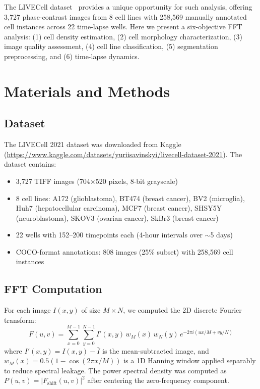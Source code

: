 \documentclass[11pt,a4paper]{article}
\begin{document}
The LIVECell dataset~\cite{edlund2021livecell} provides a unique opportunity for
such analysis, offering 3,727 phase-contrast images from 8 cell lines with 258,569
manually annotated cell instances across 22 time-lapse wells. Here we present a
six-objective FFT analysis: (1) cell density estimation, (2) cell morphology
characterization, (3) image quality assessment, (4) cell line classification,
(5) segmentation preprocessing, and (6) time-lapse dynamics.

\section{Materials and Methods}

\subsection{Dataset}

The LIVECell 2021 dataset was downloaded from Kaggle
(\url{https://www.kaggle.com/datasets/yuriisavinskyi/livecell-dataset-2021}).
The dataset contains:
\begin{itemize}
    \item 3,727 TIFF images (704$\times$520 pixels, 8-bit grayscale)
    \item 8 cell lines: A172 (glioblastoma), BT474 (breast cancer), BV2 (microglia),
          Huh7 (hepatocellular carcinoma), MCF7 (breast cancer), SHSY5Y
          (neuroblastoma), SKOV3 (ovarian cancer), SkBr3 (breast cancer)
    \item 22 wells with 152--200 timepoints each (4-hour intervals over $\sim$5 days)
    \item COCO-format annotations: 808 images (25\% subset) with 258,569 cell instances
\end{itemize}

\subsection{FFT Computation}

For each image $I(x,y)$ of size $M \times N$, we computed the 2D discrete Fourier
transform:
\begin{equation}
    F(u,v) = \sum_{x=0}^{M-1} \sum_{y=0}^{N-1} I'(x,y)\,
    w_M(x)\, w_N(y)\, e^{-2\pi i(ux/M + vy/N)}
\end{equation}
where $I'(x,y) = I(x,y) - \bar{I}$ is the mean-subtracted image, and
$w_M(x) = 0.5(1 - \cos(2\pi x/M))$ is a 1D Hanning window applied separably
to reduce spectral leakage. The power spectral density was computed as
$P(u,v) = |F_{\text{shift}}(u,v)|^2$ after centering the zero-frequency component.
\end{document}
